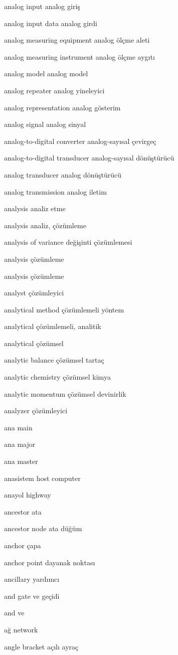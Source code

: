 \documentclass[12pt,fleqn]{article}\usepackage{../../common}
\begin{document}
analog input analog giriş

analog input data analog girdi

analog measuring equipment analog ölçme aleti

analog measuring instrument analog ölçme aygıtı

analog model analog model

analog repeater analog yineleyici

analog representation analog gösterim

analog signal analog sinyal

analog-to-digital converter analog-sayısal çevirgeç

analog-to-digital transducer analog-sayısal dönüştürücü

analog transducer analog dönüştürücü

analog transmission analog iletim

analysis analiz etme

analysis analiz, çözümleme

analysis of variance değişinti çözümlemesi

analysis çözümleme

analysis çözümleme

analyst çözümleyici

analytical method çözümlemeli yöntem

analytical çözümlemeli, analitik

analytical çözümsel

analytic balance çözümsel tartaç

analytic chemistry çözümsel kimya

analytic momentum çözümsel devinirlik

analyzer çözümleyici

ana main

ana major

ana master

anasistem host computer

anayol highway

ancestor ata

ancestor node ata düğüm

anchor çapa

anchor point dayanak noktası

ancillary yardımcı

and gate ve geçidi

and ve

ağ network

angle bracket açılı ayraç
\end{document}
